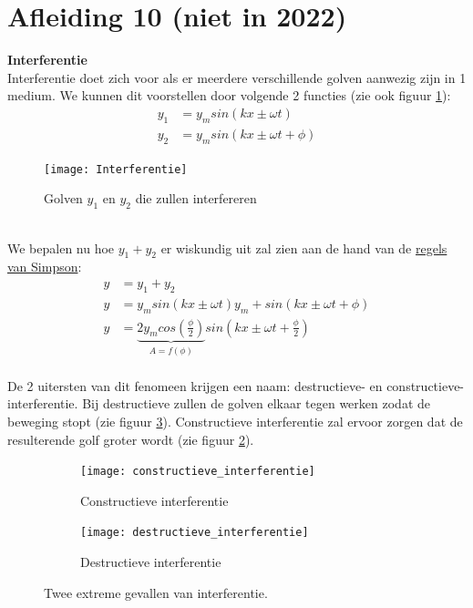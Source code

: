 \documentclass[a4paper,kul]{kulakarticle} %
\begin{document}
\section{Afleiding 10 (niet in 2022)}
\textbf{Interferentie}\\
Interferentie doet zich voor als er meerdere verschillende golven aanwezig zijn in 1 medium. We kunnen dit voorstellen door volgende 2 functies (zie ook figuur \ref{fig:interferentie}):
\begin{align*}
	y_1 & = y_msin(kx\pm\omega t)\\
	y_2 & = y_msin(kx\pm\omega t +\phi)
\end{align*}
\begin{figure}[h]
	\centering
	\texttt{[image: Interferentie]}
	\caption[Interferentie]{Golven $y_1$ en $y_2$ die zullen interfereren}
	\label{fig:interferentie}
\end{figure}\\
We bepalen nu hoe $y_1+y_2$ er wiskundig uit zal zien aan de hand van de \href{https://nl.wikipedia.org/wiki/Lijst_van_goniometrische_gelijkheden#Som-naar-product-identiteiten_(regels_van_Simpson)}{regels van Simpson}:
\begin{align*}
	y & = y_1+y_2\\
	y & = y_msin(kx\pm\omega t) y_m+sin(kx\pm\omega t +\phi)\\
	y & = \underbrace{2y_mcos(\frac{\phi}{2})}_{A = f(\phi)}sin(kx\pm\omega t+\frac{\phi}{2})
\end{align*} \\
De 2 uitersten van dit fenomeen krijgen een naam: destructieve- en constructieve-interferentie. Bij destructieve zullen de golven elkaar tegen werken zodat de beweging stopt (zie figuur \ref{fig:destructief}). Constructieve interferentie zal ervoor zorgen dat de resulterende golf groter wordt (zie figuur \ref{fig:constructief}).
\begin{figure}[h]
	\centering
	\begin{subfigure}{.4\textwidth}
		\centering
		\texttt{[image: constructieve\_interferentie]}
		\caption{Constructieve interferentie}
		\label{fig:constructief}
	\end{subfigure}%
	\begin{subfigure}{.4\textwidth}
		\centering
		\texttt{[image: destructieve\_interferentie]}
		\caption{Destructieve interferentie}
		\label{fig:destructief}
	\end{subfigure}
	\caption{Twee extreme gevallen van interferentie.}
	\label{fig:omegaVZ}
\end{figure}\\
\newpage
\end{document}
